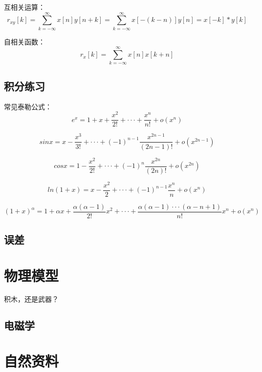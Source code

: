 \documentclass[cn,11pt]{elegantbook}
\begin{document}
互相关运算：
\begin{equation}
r_{xy}[k] = \sum_{k=-\infty}^{\infty} x[n]y[n+k]
          = \sum_{k=-\infty}^{\infty} x[-(k-n)]y[n]
          = x[-k]*y[k]
\end{equation}

自相关函数：
\begin{equation}
r_{x}[k] = \sum_{k=-\infty}^{\infty} x[n]x[k+n]
\end{equation}

\section{积分练习}
       
常见泰勒公式：
   \begin{equation}
    e^x =1 + x + \frac{x^2}{2!}  
    +  \cdot \cdot \cdot  
    +\frac{x^n}{n!} 
    +o(x^n) 
   \end{equation}

   \begin{equation}
    sinx = x - \frac{x^3}{3!} 
    + \cdot \cdot \cdot  
    + (-1)^{n-1} \frac{x^{2n-1}}{(2n-1)!} 
    + o(x^{2n-1})
   \end{equation}

   \begin{equation}
       cosx = 1- \frac{x^2}{2!} 
       + \cdot \cdot \cdot 
       + (-1)^n \frac{x^{2n}}{(2n)!}
       + o(x^{2n})
   \end{equation}

   \begin{equation}
       ln(1+x) = x - \frac{x^2}{2}
       +\cdot \cdot \cdot
       +(-1)^{n-1}\frac{x^n}{n}
       +o(x^n)
   \end{equation}

   \begin{equation}
       (1+x)^\alpha = 1 + \alpha x 
       + \frac{\alpha(\alpha-1)}{2!}x^2
       + \cdot \cdot \cdot
       + \frac{\alpha(\alpha-1) \cdot \cdot \cdot(\alpha-n+1)}{n!}x^n
       + o(x^n) 
   \end{equation}

   

\section{误差}
       

      


\chapter{物理模型}
  积木，还是武器？

\section{电磁学}

        
\appendix
\chapter{自然资料}
\end{document}
